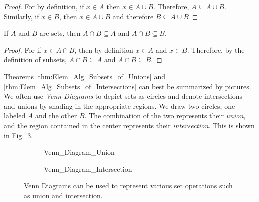 \documentclass[crop=false,class=book,oneside]{standalone}
\begin{document}
            \begin{proof}
                For by definition, if $x\in{A}$ then
                $x\in{A}\cup{B}$. Therefore,
                $A\subseteq{A}\cup{B}$.
                Similarly, if $x\in{B}$, then
                $x\in{A}\cup{B}$ and therefore
                $B\subseteq{A}\cup{B}$
            \end{proof}
            \begin{theorem}
                \label{thm:Elem_Alg_Subsets_of_Intersections}
                If $A$ and $B$ are sets, then
                $A\cap{B}\subseteq{A}$ and
                $A\cap{B}\subseteq{B}$.
            \end{theorem}
            \begin{proof}
                For if $x\in{A}\cap{B}$, then by definition
                $x\in{A}$ and $x\in{B}$.
                Therefore, by the definition of subsets,
                ${A}\cap{B}\subseteq{A}$ and
                ${A}\cap{B}\subseteq{B}$.
            \end{proof}
            Theorems \ref{thm:Elem_Alg_Subsets_of_Unions}
            and \ref{thm:Elem_Alg_Subsets_of_Intersections}
            can best be summarized by pictures. We often use
            \textit{Venn Diagrams} to depict sets as circles
            and denote intersections and unions by shading
            in the appropriate regions. We draw two circles,
            one labeled $A$ and the other $B$. The combination
            of the two represents their \textit{union},
            and the region contained in the center
            represents their \textit{intersection}.
            This is shown in Fig.~\ref{fig:Elem_Alg_Venn_Diagram}.
            \begin{figure}[H]
                \captionsetup{type=figure}
                \centering
                \begin{subfigure}[b]{0.49\textwidth}
                    \captionsetup{type=figure}
                    \centering
                    {Venn_Diagram_Union}
                    \label{fig:Elem_Alg_Union_Venn_Diagram}
                \end{subfigure}
                \begin{subfigure}[b]{0.49\textwidth}
                    \captionsetup{type=figure}
                    \centering
                    {Venn_Diagram_Intersection}
                    \label{fig:Elem_Alg_Intersection_Venn_diagram}
                \end{subfigure}
                \caption[Venn Diagrams for Union and Intersection]
                        {Venn Diagrams can be used to represent
                         various set operations such as union
                         and intersection.}
                \label{fig:Elem_Alg_Venn_Diagram}
            \end{figure}
\end{document}
